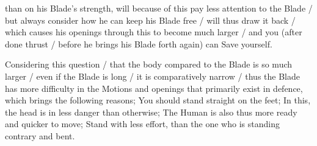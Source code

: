 \newpage


\newpage



than on his Blade's strength, will because of this pay less attention
to the Blade / but always consider how he can keep his Blade free /
will thus draw it back / which causes his openings through this to
become much larger / and you (after done thrust / before he brings his
Blade forth again) can Save yourself.



Considering this question / that the body compared to the Blade is so
much larger / even if the Blade is long / it is comparatively narrow /
thus the Blade has more difficulty in the Motions and openings that
primarily exist in defence, which brings the following reasons; You
should stand straight on the feet; In this, the head is in less danger
than otherwise; The Human is also thus more ready and quicker to move;
Stand with less effort, than the one who is standing contrary and bent.


